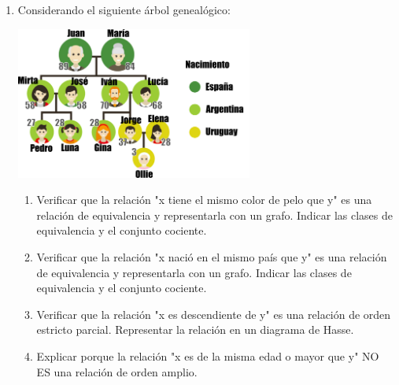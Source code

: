 \documentclass[a4paper]{article}
\newcommand{\exercise}{\item}
\begin{document}
\begin{enumerate}
\begin{enumerate} [label=(\alph*)]
		\item Dados dos conjuntos $A$ y $B$ se define la relación "$A$ es subconjunto de en $B$" donde $x\mathrel{R}y$ se anota $A\subseteq B$ definida de la forma $R = \left\lbrace (A,B) ~|~ \forall x \in A ~~( x\in A \to x\in B) \right\rbrace$
		\item Dada la relación $R$ definida en $\mathbb{R}$, se establece la relación "$x$ es menor que $y$" donde $x\mathrel{R}y$ se anota $x<y$ definida de la forma $R = \left\lbrace (x,y) ~|~ \exists k \in (0,+\infty) ~~(y=x+k)  \right\rbrace$
	\end{enumerate}
	\exercise Considerando el siguiente árbol genealógico: \\ \begin{center} \includegraphics[height=5cm]{familia.png} \end{center}
	\begin{enumerate} [label=(\alph*)]
		\item Verificar que la relación "x tiene el mismo color de pelo que y" es una relación de equivalencia y representarla con un grafo. Indicar las clases de equivalencia y el conjunto cociente.
		\item Verificar que la relación "x nació en el mismo país que y" es una relación de equivalencia y representarla con un grafo. Indicar las clases de equivalencia y el conjunto cociente.
		\item Verificar que la relación "x es descendiente de y" es una relación de orden estricto parcial. Representar la relación en un diagrama de Hasse.
		\item Explicar porque la relación "x es de la misma edad o mayor que y" NO ES una relación de orden amplio.
	\end{enumerate}
\end{enumerate}
\vspace{20pt} 
\end{document}
